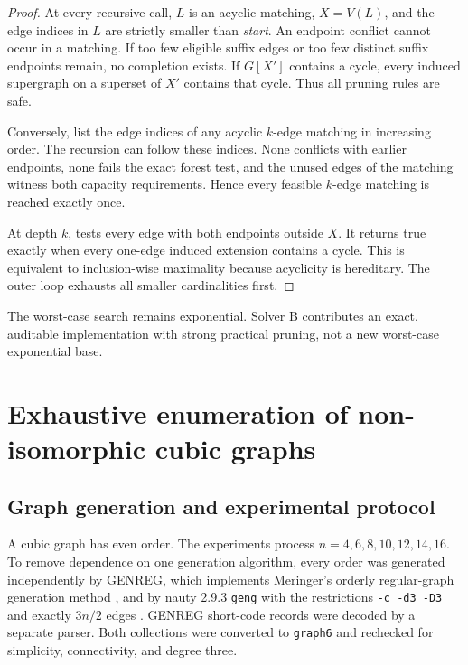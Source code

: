 \documentclass[smallextended,natbib,nospthms]{svjour3}
\theoremstyle{definition}
\theoremstyle{remark}
\begin{document}
\begin{proof}
At every recursive call, $L$ is an acyclic matching, $X=V(L)$, and the edge
indices in $L$ are strictly smaller than \textit{start}. An endpoint conflict
cannot occur in a matching. If too few eligible suffix edges or too few
distinct suffix endpoints remain, no completion exists. If $G[X']$ contains
a cycle, every induced supergraph on a superset of $X'$ contains that cycle.
Thus all pruning rules are safe.

Conversely, list the edge indices of any acyclic $k$-edge matching in increasing
order. The recursion can follow these indices. None conflicts with earlier
endpoints, none fails the exact forest test, and the unused edges of the
matching witness both capacity requirements. Hence every feasible $k$-edge
matching is reached exactly once.

At depth $k$,  tests every edge with both endpoints outside
$X$. It returns true exactly when every one-edge induced extension contains a
cycle. This is equivalent to inclusion-wise maximality because acyclicity is
hereditary. The outer loop exhausts all smaller cardinalities first.
\end{proof}

The worst-case search remains exponential. Solver B contributes an exact,
auditable implementation with strong practical pruning, not a new worst-case
exponential base.

\section{Exhaustive enumeration of non-isomorphic cubic graphs}
\label{sec:census}

\subsection{Graph generation and experimental protocol}

A cubic graph has even order. The experiments process
$n=4,6,8,10,12,14,16$. To remove dependence on one generation algorithm,
every order was generated independently by GENREG, which implements
Meringer's orderly regular-graph generation method \cite{Meringer1999}, and by
nauty 2.9.3 \texttt{geng} with the restrictions
\texttt{-c -d3 -D3} and exactly $3n/2$ edges \cite{McKayPiperno2014}.
GENREG short-code records were decoded by a separate parser. Both collections
were converted to \texttt{graph6} and rechecked for simplicity, connectivity,
and degree three.
\end{document}
